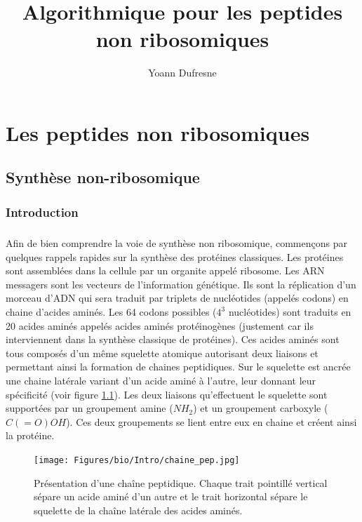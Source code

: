 \documentclass[12pt,french,twoside]{report}
\title{Algorithmique pour les peptides non ribosomiques}
\author{Yoann Dufresne}
\begin{document}
\maketitle
\tableofcontents

\chapter{Les peptides non ribosomiques}

\section{Synthèse non-ribosomique}

\subsection{Introduction}

\paragraph{}Afin de bien comprendre la voie de synthèse non ribosomique, commençons par quelques rappels rapides sur la synthèse des protéines classiques.
Les protéines sont assemblées dans la cellule par un organite appelé ribosome.
Les ARN messagers sont les vecteurs de l'information génétique.
Ils sont la réplication d'un morceau d'ADN qui sera traduit par triplets de nucléotides (appelés codons) en chaine d'acides aminés.
Les 64 codons possibles ($4^3$ nucléotides) sont traduits en 20 acides aminés appelés acides aminés protéinogènes (justement car ils interviennent dans la synthèse classique de protéines).
Ces acides aminés sont tous composés d'un même squelette atomique autorisant deux liaisons et permettant ainsi la formation de chaines peptidiques.
Sur le squelette est ancrée une chaine latérale variant d'un acide aminé à l'autre, leur donnant leur spécificité (voir figure \ref{chaine_pep}).
Les deux liaisons qu'effectuent le squelette sont supportées par un groupement amine ($NH_2$) et un groupement carboxyle ($C(=O)OH$).
Ces deux groupements se lient entre eux en chaine et créent ainsi la protéine.

\begin{figure}[h!]
  \begin{center}
    \texttt{[image: Figures/bio/Intro/chaine\_pep.jpg]}
    \caption{\label{chaine_pep}Présentation d'une chaîne peptidique.
    Chaque trait pointillé vertical sépare un acide aminé d'un autre et le trait horizontal sépare le squelette de la chaîne latérale des acides aminés.}
  \end{center}
\end{figure}
\end{document}
